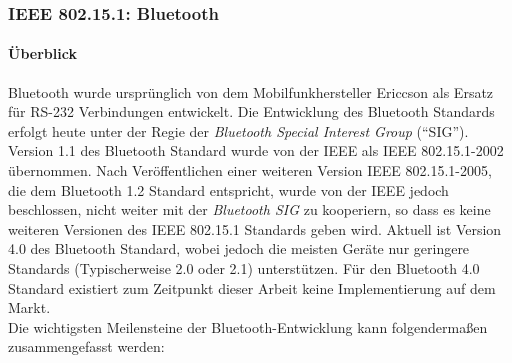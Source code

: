     \subsubsection{IEEE 802.15.1: Bluetooth}
        \paragraph{Überblick}
            Bluetooth wurde ursprünglich von dem Mobilfunkhersteller Ericcson als Ersatz für
            RS-232 Verbindungen entwickelt. Die Entwicklung des Bluetooth Standards erfolgt
            heute unter der Regie der \textsl{Bluetooth Special Interest Group} ("`SIG"').
            Version 1.1 des Bluetooth Standard wurde 
            von der IEEE als IEEE 802.15.1-2002 übernommen. Nach Veröffentlichen einer
            weiteren Version IEEE 802.15.1-2005, die dem Bluetooth 1.2 Standard entspricht,
            wurde von der IEEE jedoch beschlossen, nicht weiter mit der \textsl{Bluetooth SIG}
            zu kooperiern, so dass es keine weiteren Versionen des IEEE 802.15.1 Standards 
            geben wird. Aktuell ist Version 4.0 des Bluetooth Standard, wobei jedoch die
            meisten Geräte nur geringere Standards (Typischerweise 2.0 oder 2.1) unterstützen.
            Für den Bluetooth 4.0 Standard existiert zum Zeitpunkt dieser Arbeit keine 
            Implementierung auf dem Markt.\\
            Die wichtigsten Meilensteine der Bluetooth-Entwicklung kann folgendermaßen
            zusammengefasst werden:

